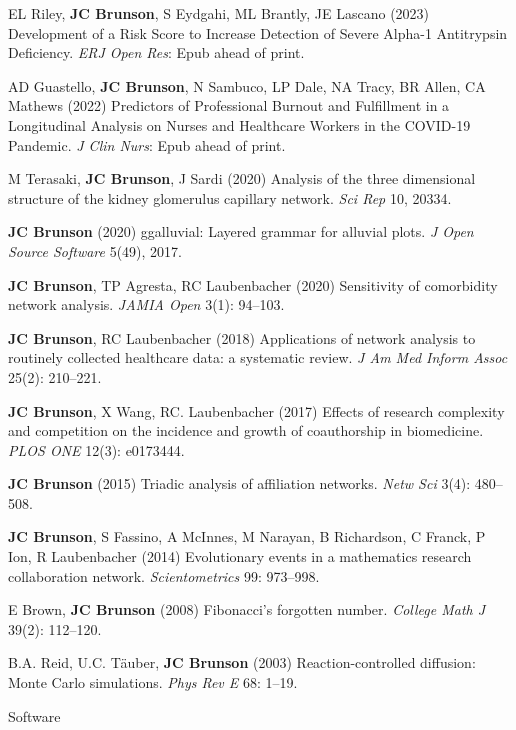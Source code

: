 \documentclass[10pt,a4paper]{article}
\begin{document}
\begin{enumerate}[label={[\arabic*]},labelindent=1cm,nolistsep]
\item
EL Riley, {\bfseries JC Brunson}, S Eydgahi, ML Brantly, JE Lascano (2023) Development of a Risk Score to Increase Detection of Severe Alpha-1 Antitrypsin Deficiency. {\itshape ERJ Open Res}: Epub ahead of print.
\item
AD Guastello, {\bfseries JC Brunson}, N Sambuco, LP Dale, NA Tracy, BR Allen, CA Mathews (2022) Predictors of Professional Burnout and Fulfillment in a Longitudinal Analysis on Nurses and Healthcare Workers in the COVID-19 Pandemic. {\itshape J Clin Nurs}: Epub ahead of print.
\item
M Terasaki, {\bfseries JC Brunson}, J Sardi (2020) Analysis of the three dimensional structure of the kidney glomerulus capillary network. {\itshape Sci Rep} 10, 20334.
\item
{\bfseries JC Brunson} (2020) ggalluvial: Layered grammar for alluvial plots. {\itshape J Open Source Software} 5(49), 2017.
\item
{\bfseries JC Brunson}, TP Agresta, RC Laubenbacher (2020) Sensitivity of comorbidity network analysis. {\itshape JAMIA Open} 3(1): 94--103.
\item
{\bfseries JC Brunson}, RC Laubenbacher (2018) Applications of network analysis to routinely collected healthcare data: a systematic review. {\itshape J Am Med Inform Assoc} 25(2): 210--221.
\item
{\bfseries JC Brunson}, X Wang, RC. Laubenbacher (2017) Effects of research complexity and competition on the incidence and growth of coauthorship in biomedicine. {\itshape PLOS ONE} 12(3): e0173444.
\item
{\bfseries JC Brunson} (2015) Triadic analysis of affiliation networks. {\itshape Netw Sci} 3(4): 480--508.
\item
{\bfseries JC Brunson}, S Fassino, A McInnes, M Narayan, B Richardson, C Franck, P Ion, R Laubenbacher (2014) Evolutionary events in a mathematics research collaboration network. {\itshape Scientometrics} 99: 973--998.
\item
E Brown, {\bfseries JC Brunson} (2008) Fibonacci's forgotten number. {\itshape College Math J} 39(2): 112--120.
\item
B.A. Reid, U.C. T\"{a}uber, {\bfseries JC Brunson} (2003) Reaction-controlled diffusion: Monte Carlo simulations. {\itshape Phys Rev E} 68: 1--19.
\setcounter{paper}{\value{enumi}}
\end{enumerate}
%
\vspace{.25cm}
{\sc Software}
\end{document}
